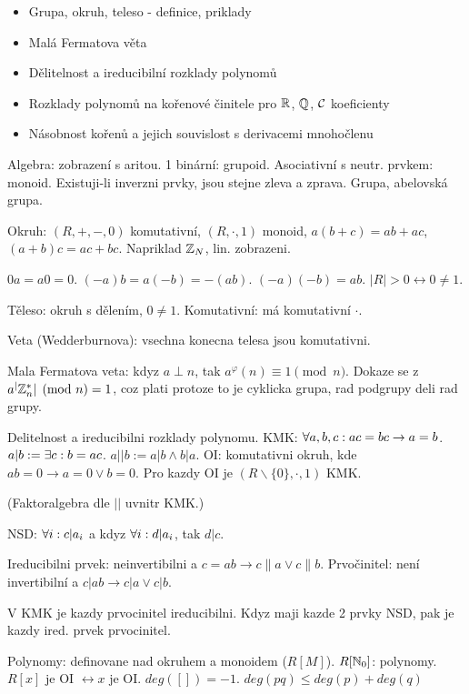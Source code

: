 \begin{itemize}
\item Grupa, okruh, teleso - definice, priklady
\item Malá Fermatova věta
\item Dělitelnost a ireducibilní rozklady polynomů
\item Rozklady polynomů na kořenové činitele pro $\mathbb{R}$, $\mathbb{Q}$, $\mathcal{C}$ koeficienty
\item Násobnost kořenů a jejich souvislost s derivacemi mnohočlenu
\end{itemize}

Algebra: zobrazení s aritou. 1 binární: grupoid. Asociativní s neutr. prvkem:
monoid. Existuji-li inverzni prvky, jsou stejne zleva a zprava.
Grupa, abelovská grupa.

Okruh: $(R,+,-,0)$ komutativní, $(R,\cdot,1)$ monoid, $a(b+c)=ab+ac$,
$(a+b)c=ac+bc$. Napriklad $\mathbb{Z}_N$, lin. zobrazeni.

$0a = a0 = 0$. $(-a)b=a(-b)=-(ab)$. $(-a)(-b)=ab$. $|R|>0\leftrightarrow 0\neq
1$.

Těleso: okruh s dělením, $0\neq 1$. Komutativní: má komutativní $\cdot$.

Veta (Wedderburnova): vsechna konecna telesa jsou komutativni.

Mala Fermatova veta: kdyz $a\perp n$, tak $a^\varphi(n)\equiv 1\pmod n$.
Dokaze se z $a^|\mathbb{Z}_n^*|\pmod n=1$, coz plati protoze to je cyklicka grupa,
rad podgrupy deli rad grupy.

Delitelnost a ireducibilni rozklady polynomu.
KMK: $\forall a,b,c: ac=bc\rightarrow a=b$. $a|b:=\exists c: b=ac$. $a||b:=a|b\wedge b|a$.
OI: komutativni okruh, kde $ab=0\rightarrow a=0\vee b=0$.
Pro kazdy OI je $(R\smallsetminus\{0\},\cdot,1)$ KMK.

(Faktoralgebra dle $||$ uvnitr KMK.)

NSD: $\forall i: c|a_i$ a kdyz $\forall i: d|a_i$, tak $d|c$.

Ireducibilni prvek: neinvertibilni a $c=ab\rightarrow c\|a\vee c\|b$.
Prvočinitel: není invertibilní a $c|ab\rightarrow c|a\vee c|b$.

V KMK je kazdy prvocinitel ireducibilni. Kdyz maji kazde 2 prvky NSD,
pak je kazdy ired. prvek prvocinitel.

Polynomy: definovane nad okruhem a monoidem ($R[M]$). $R[\mathbb{N}_0]$: polynomy.
$R[x]$ je OI $\leftrightarrow x$ je OI.
$deg([])=-1$. $deg(pq)\leq deg(p)+deg(q)$

